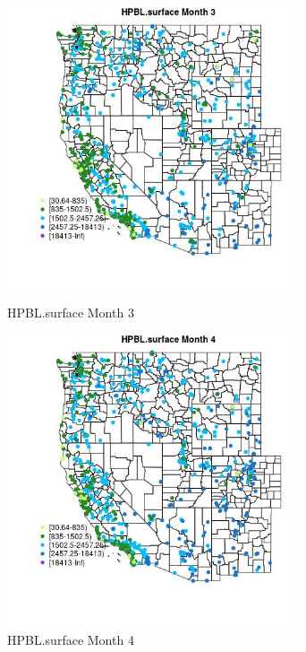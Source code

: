 \begin{figure} 
\centering  
\includegraphics[width=0.77\textwidth]{Code_Outputs/Report_ML_input_PM25_Step4_part_f_de_duplicated_aves_prioritize_24hr_obswNAs_MapObsMo3HPBLsurface.jpg} 
\caption{\label{fig:Report_ML_input_PM25_Step4_part_f_de_duplicated_aves_prioritize_24hr_obswNAsMapObsMo3HPBLsurface}HPBL.surface Month 3} 
\end{figure} 
 

\begin{figure} 
\centering  
\includegraphics[width=0.77\textwidth]{Code_Outputs/Report_ML_input_PM25_Step4_part_f_de_duplicated_aves_prioritize_24hr_obswNAs_MapObsMo4HPBLsurface.jpg} 
\caption{\label{fig:Report_ML_input_PM25_Step4_part_f_de_duplicated_aves_prioritize_24hr_obswNAsMapObsMo4HPBLsurface}HPBL.surface Month 4} 
\end{figure} 
 

